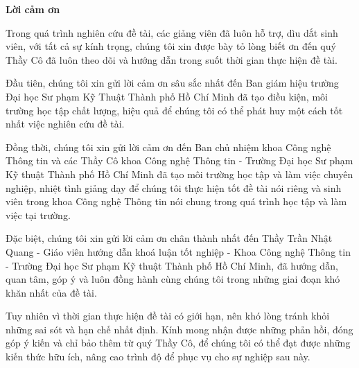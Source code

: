 \thispagestyle{empty}
{
\begin{center}
    \fontsize{20pt}{30pt}\selectfont
    \textbf{Lời cảm ơn}
\end{center}
{
\setlength{\parindent}{1cm}
\fontsize{14pt}{24.5pt}\selectfont
Trong quá trình nghiên cứu đề tài, các giảng viên đã luôn hỗ trợ, dìu dắt sinh viên, với tất cả sự kính trọng, chúng tôi xin được bày tỏ lòng biết ơn đến quý Thầy Cô đã luôn theo dõi và hướng dẫn trong suốt thời gian thực hiện đề tài.

Đầu tiên, chúng tôi xin gửi lời cảm ơn sâu sắc nhất đến Ban giám hiệu trường Đại học Sư phạm Kỹ Thuật Thành phố Hồ Chí Minh đã tạo điều kiện, môi trường học tập chất lượng, hiệu quả để chúng tôi có thể phát huy một cách tốt nhất việc nghiên cứu đề tài.

Đồng thời, chúng tôi xin gửi lời cảm ơn đến Ban chủ nhiệm khoa Công nghệ Thông tin và các Thầy Cô khoa Công nghệ Thông tin - Trường Đại học Sư phạm Kỹ thuật Thành phố Hồ Chí Minh đã tạo môi trường học tập và làm việc chuyên nghiệp, nhiệt tình giảng dạy để chúng tôi thực hiện tốt đề tài nói riêng và sinh viên trong khoa Công nghệ Thông tin nói chung trong quá trình học tập và làm việc tại trường.

Đặc biệt, chúng tôi xin gửi lời cảm ơn chân thành nhất đến Thầy Trần Nhật Quang - Giáo viên hướng dẫn khoá luận tốt nghiệp - Khoa Công nghệ Thông tin - Trường Đại học Sư phạm Kỹ thuật Thành phố Hồ Chí Minh, đã hướng dẫn, quan tâm, góp ý và luôn đồng hành cùng chúng tôi trong những giai đoạn khó khăn nhất của đề tài.

Tuy nhiên vì thời gian thực hiện đề tài có giới hạn, nên khó lòng tránh khỏi những sai sót và hạn chế nhất định. Kính mong nhận được những phản hồi, đóng góp ý kiến và chỉ bảo thêm từ quý Thầy Cô, để chúng tôi có thể đạt được những kiến thức hữu ích, nâng cao trình độ để phục vụ cho sự nghiệp sau này.

}
}
\restoregeometry